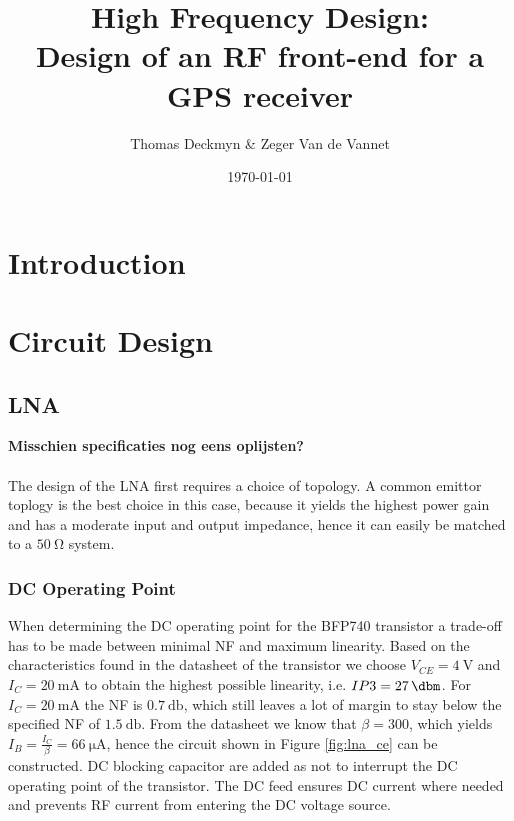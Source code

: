 \documentclass[a4paper]{article}        %
\title{High Frequency Design: \\ Design of an RF front-end for a GPS receiver}
\author{Thomas Deckmyn \& Zeger Van de Vannet}
\date{\today}
\begin{document}
\maketitle

\tableofcontents

\section{Introduction}
\section{Circuit Design}
	\subsection{LNA}

	\textbf{Misschien specificaties nog eens oplijsten?}\\\\
	The design of the LNA first requires a choice of topology. A common emittor toplogy is the best choice in this case, because it yields the highest power gain and has a moderate input and output impedance, hence it can easily be matched to a $\SI{50}{\ohm}$ system.
		\subsubsection{DC Operating Point}
			When determining the DC operating point for the BFP740 transistor a trade-off has to be made between minimal NF and maximum linearity. Based on the characteristics found in the datasheet \cite{transdatasheet} of the transistor we choose $V_{CE} = \SI{4}{\volt}$ and $I_C = \SI{20}{\milli\ampere}$ to obtain the highest possible linearity, i.e. $IP3 = \SI{27}{\dbm} $. For $I_C = \SI{20}{\milli\ampere}$ the NF is $\SI{0.7}{\decibel}$, which still leaves a lot of margin to stay below the specified NF of $\SI{1.5}{\decibel}$. From the datasheet we know that $\beta = 300$, which yields $I_B = \frac{I_C}{\beta} = \SI{66}{\micro\ampere}$, hence the circuit shown in Figure \ref{fig:lna_ce} can be constructed. DC blocking capacitor are added as not to interrupt the DC operating point of the transistor. The DC feed ensures DC current where needed and prevents RF current from entering the DC voltage source. \\
\end{document}
